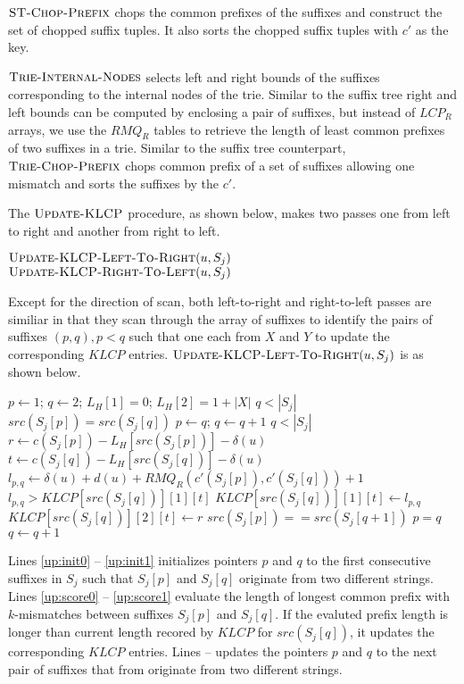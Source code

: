 \documentclass{article}
\begin{document}
$\textnormal{\scshape ST-Chop-Prefix}$ chops the common prefixes of the suffixes and
construct the set of chopped suffix tuples. It also sorts the chopped
suffix tuples with $c'$ as the key.

$\textnormal{\scshape Trie-Internal-Nodes}$ selects left and right bounds of the
suffixes corresponding to the internal nodes of the trie. Similar to the
suffix tree right and left bounds can be computed by enclosing a pair of
suffixes, but instead of $LCP_R$ arrays, we use the $RMQ_R$ tables to
retrieve the length of least common prefixes of two suffixes in a trie.
Similar to the suffix tree counterpart, $\textnormal{\scshape Trie-Chop-Prefix}$ chops
common prefix of a set of suffixes allowing one mismatch and sorts the
suffixes by the $c'$.

The $\textnormal{\scshape Update-KLCP}$ procedure, as shown below, makes two passes one
from left to right and another from right to left.

\begin{codebox}
\li $\textnormal{\scshape Update-KLCP-Left-To-Right}(u, S_j)$
\li $\textnormal{\scshape Update-KLCP-Right-To-Left}(u, S_j)$
\End
\end{codebox}
Except for the direction of scan, both left-to-right and right-to-left
passes are similiar in that they scan through the array of suffixes to
identify the pairs of suffixes $(p, q), p < q$ such that one each from
$X$ and $Y$ to update the corresponding $KLCP$ entries.
$\textnormal{\scshape Update-KLCP-Left-To-Right}(u, S_j)$ is as shown below.
\begin{codebox}
\li $p \gets 1$; $q \gets 2$; $L_H[1] = 0$; $L_H[2] = 1 + |X|$
    \label{up:init0}
\li \While $q < |S_j|$  $src(S_j[p]) = src(S_j[q])$
\li \Do $p \gets q$; $q \gets q + 1$ \label{up:init1}
\End
\li \While $q < |S_j|$
\li \Do $r \gets c(S_j[p]) - L_H[src(S_j[p])] - \delta(u)$  %
\label{up:score0}
\li     $t \gets c(S_j[q]) - L_H[src(S_j[q])] - \delta(u)$
\li  $l_{p,q} \gets \delta(u) + d(u) + RMQ_R(c'(S_j[p]), c'(S_j[q])) + 1$
\li  \If $l_{p,q} > KLCP[src(S_j[q])][1][t]$
\li    \Do $KLCP[src(S_j[q])][1][t]  \gets l_{p,q}$
\li        $KLCP[src(S_j[q])][2][t] \gets r$
\End \label{up:score1}
\li \If $src(S_j[p]) == src(S_j[q + 1])$ \label{up:move0}
\li  \Then $p = q$ \End
\li   $q \gets q + 1$ \label{up:move1}
\End
\end{codebox}
Lines \ref{up:init0} -- \ref{up:init1} initializes pointers $p$ and $q$
to the first consecutive suffixes in $S_j$ such that $S_j[p]$ and
$S_j[q]$ originate from two different strings. Lines \ref{up:score0} --
\ref{up:score1} evaluate the length of longest common prefix with
$k$-mismatches between suffixes $S_j[p]$ and $S_j[q]$. If the evaluted
prefix length is longer than current length recored by $KLCP$ for
$src(S_j[q])$, it updates the corresponding $KLCP$
entries. Lines \label{up:move0} -- \label{up:move1} updates the pointers
$p$ and $q$ to the next pair of suffixes that from originate from two
different strings.
\end{document}
